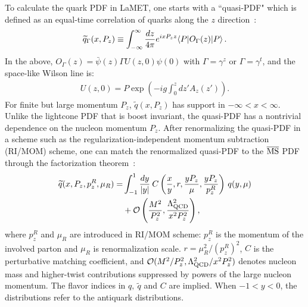 To calculate the quark PDF in LaMET, one starts with a ``quasi-PDF" which is defined as an equal-time correlation of quarks along the $z$ direction~\cite{Ji:2013dva}: 
\begin{align}\label{eq:qpdf}
\widetilde{q}_{\Gamma}(x,P_z) \equiv \int_{-\infty}^\infty {dz\over 4\pi} e^{ixP_zz}\langle P |O_{\Gamma}(z)| P \rangle \,.
\end{align}
In the above,
$O_{\Gamma}(z)=\bar{\psi}  (z) \Gamma U (z, 0) \psi (0)$ with $\Gamma=\gamma^z$ or $\Gamma=\gamma^t$, and the space-like Wilson line  is:
\begin{align}
U(z,0) = P\exp\left(-ig\int_0^z dz' A_z(z')\right) .
\end{align}
For finite but large momentum $P_z$, $\widetilde{q}(x,P_z)$ has support in $-\infty < x < \infty$.
 Unlike the lightcone PDF that is boost invariant, the quasi-PDF has a nontrivial dependence on the nucleon momentum $P_z$. 
After renormalizing the quasi-PDF  in a scheme  such as the regularization-independent momentum subtraction (RI/MOM) scheme, one can match the renormalized quasi-PDF to the $\overline{\rm MS}$ PDF  through   the factorization theorem~\cite{Ji:2013dva,Ji:2014gla,Stewart:2017tvs,Izubuchi:2018srq,Ma:2014jla,Ma:2017pxb}: 
\begin{align} \label{eq:fact}
\widetilde{q}(x,P_z, p^R_z,\mu_R)=&\int_{-1}^1 {dy\over |y|}\: C\left({x\over y},r,\frac{yP_z}{\mu},\frac{yP_z}{p_z^R}\right) \, q(y,\mu)\nonumber\\
&+\mathcal{O}\left({M^2\over P_z^2},{\Lambda_{\text{QCD}}^2\over x^2 P_z^2}\right) ,
\end{align}
where $p_z^R$ and $\mu_R$ are introduced in RI/MOM scheme: $p_z^R$  is  the momentum of the involved  parton and $\mu_R$ is renormalization scale.  $r=\mu_R^2/(p_z^R)^2$, $C$ is the perturbative matching coefficient, and $\mathcal{O}(M^2/P_z^2, \Lambda_{\rm QCD}^2/x^2P_z^2)$ denotes nucleon  mass and higher-twist contributions suppressed by   powers of the large nucleon momentum. The flavor indices in  $q,\ \widetilde{q}$ and   $C$ are implied. When $-1<y<0$, the distributions   refer  to  the antiquark distributions.



